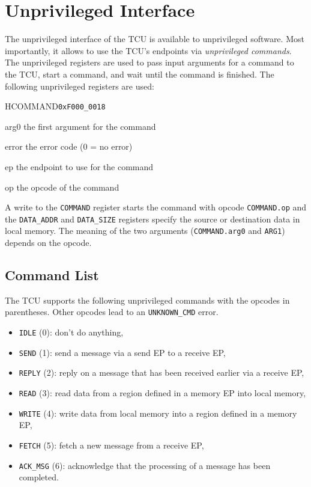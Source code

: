 \chapter{Unprivileged Interface}

The unprivileged interface of the TCU is available to unprivileged software. Most importantly, it
allows to use the TCU's endpoints via \emph{unprivileged commands}. The unprivileged registers are
used to pass input arguments for a command to the TCU, start a command, and wait until the command
is finished. The following unprivileged registers are used:

\begin{register}{H}{COMMAND}{\texttt{0xF000\_0018}}
  \regnewline%
  \begin{regdesc}\begin{reglist}
    \item[arg0] the first argument for the command
    \item[error] the error code (0 = no error)
    \item[ep] the endpoint to use for the command
    \item[op] the opcode of the command
  \end{reglist}\end{regdesc}
\end{register}

\noindent A write to the \texttt{COMMAND} register starts the command with opcode
\texttt{COMMAND.op} and the \texttt{DATA\_ADDR} and \texttt{DATA\_SIZE} registers specify the source
or destination data in local memory. The meaning of the two arguments (\texttt{COMMAND.arg0} and
\texttt{ARG1}) depends on the opcode.

\section{Command List}

The TCU supports the following unprivileged commands with the opcodes in parentheses. Other opcodes
lead to an \texttt{UNKNOWN\_CMD} error.

\begin{itemize}
  \item \texttt{IDLE} (0): don't do anything,
  \item \texttt{SEND} (1): send a message via a send EP to a receive EP,
  \item \texttt{REPLY} (2): reply on a message that has been received earlier via a receive EP,
  \item \texttt{READ} (3): read data from a region defined in a memory EP into local memory,
  \item \texttt{WRITE} (4): write data from local memory into a region defined in a memory EP,
  \item \texttt{FETCH} (5): fetch a new message from a receive EP,
  \item \texttt{ACK\_MSG} (6): acknowledge that the processing of a message has been completed.
\end{itemize}

